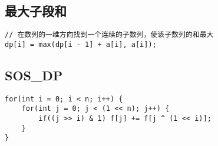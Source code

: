 \subsection{最大子段和}
\begin{lstlisting}
// 在数列的一维方向找到一个连续的子数列，使该子数列的和最大
dp[i] = max(dp[i - 1] + a[i], a[i]);
\end{lstlisting}

\subsection{SOS\_DP}

\begin{lstlisting}
for(int i = 0; i < n; i++) {
	for(int j = 0; j < (1 << n); j++) {
		if((j >> i) & 1) f[j] += f[j ^ (1 << i)];
	}
}
\end{lstlisting}